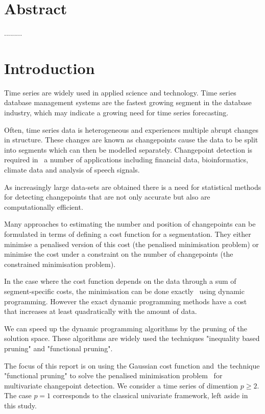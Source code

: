 \documentclass[a4paper,12pt]{article}
\begin{document}
	\section*{Abstract}
	.........
	
	\section*{Introduction}
	\label{Introduction}
	
	Time series are widely used in applied science and technology. Time series database management systems are the fastest growing segment in the database industry, which may indicate a growing need for time series forecasting.
	
	Often, time series data is heterogeneous and experiences multiple abrupt changes in structure. These changes are known as changepoints cause the data to be split into segments which can then be modelled separately. Changepoint detection is required in  a number of applications including financial data, bioinformatics, climate data and analysis of speech signals.
	
	As increasingly large data-sets are obtained there is a need for statistical methods for detecting changepoints that are not only accurate but also are computationally efficient.
	
	Many approaches to estimating the number and position of changepoints can be formulated in terms of defining a cost function for a segmentation. They either minimise a penalised version of this cost (the penalised minimisation problem) or minimise the cost under a constraint on the number of changepoints (the constrained minimisation problem).  
	
	In the case where the cost function depends on the data through a sum of segment-specific costs, the minimisation can be done exactly  using dynamic programming. However the exact dynamic programming methods have a cost that increases at least quadratically with the amount of data. 
	
	We can speed up the dynamic programming algorithms by the pruning of the solution space. These algorithms are widely used the techniques "inequality based pruning" and "functional pruning".
	

	
	The focus of this report is on using  the Gaussian cost function and the technique "functional pruning" to solve the penalised minimisation problem  for multivariate changepoint detection. We consider a time series of dimention $p\ge 2$. The case $p = 1$ corresponds to the classical univariate framework, left aside in this study.
	
\end{document}
